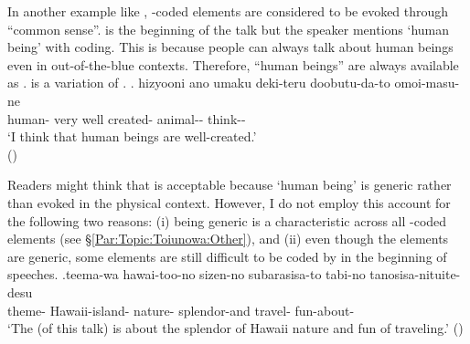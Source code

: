 In another example like \Next,
-coded elements are considered to be evoked through ``common sense''.
\Next is the beginning of the talk
but the speaker mentions  `human being' with  coding.
This is because
people can always talk about human beings even in out-of-the-blue contexts.
Therefore, ``human beings'' are always available as .
 is a variation of .
%
\exg.\label{ExNingenToiunowa} hizyooni ano umaku deki-teru doobutu-da-to omoi-masu-ne \\
	human- very  well created- animal-- think-- \\
	`I think that human beings are well-created.' \\
 \hfill{()}
%

Readers might think that \Last is acceptable because `human being' is generic rather than evoked in the physical context.
However, I do not employ this account for the following two reasons:
(i) being generic is a characteristic across all -coded elements (see \S \ref{Par:Topic:Toiunowa:Other}), and
(ii) even though the elements are generic, some elements are still difficult to be coded by  in the beginning of speeches.
%
\exg.\label{Par:Toiunowa:Ex:Hawaii}teema-wa hawai-too-no sizen-no subarasisa-to tabi-no tanosisa-nituite-desu \\
   theme- Hawaii-island- nature- splendor-and travel- fun-about- \\
   `The  (of this talk) is about the splendor of Hawaii nature and fun of traveling.'
 \hfill{()}

